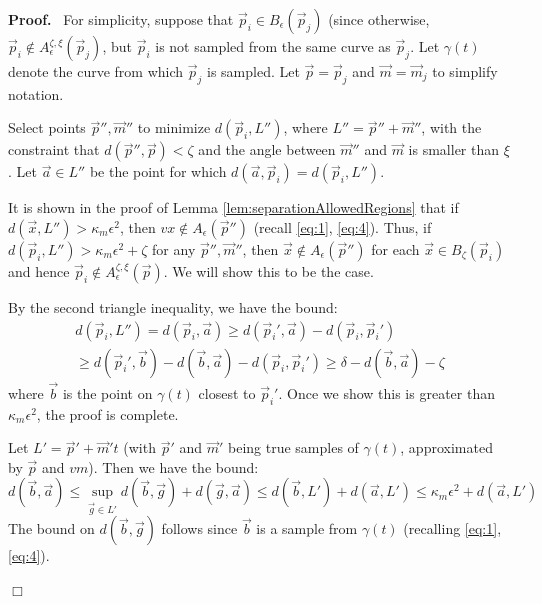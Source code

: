 \documentclass{article}
\newcommand{\nin}{\not\in}
\newenvironment{proof}{
  \noindent\textbf{Proof.}\ }{\hspace*{\fill}
  \begin{math}\Box\end{math}\medskip}
\numberwithin{cntr}{section}
\numberwithin{equation}{section}
\newcommand{\vx}[0]{{\vec{x}}}
\newcommand{\vp}[0]{{\vec{p}}}
\newcommand{\vm}[0]{{\vec{m}}}
\newcommand{\va}[0]{{\vec{a}}}
\newcommand{\vb}[0]{{\vec{b}}}
\newcommand{\vg}[0]{{\vec{g}}}
\newcommand{\ball}[2]{ { B_{#1}(#2) } }
\newcommand{\allowed}[2]{ { A_{#1}(#2) } }
\newcommand{\curvemax}{{\kappa_{m}}}
\newcommand{\curvesep}{{\delta}}
\newcommand{\pointNoise}{{\zeta}}
\newcommand{\tanNoise}{{\xi}}
\newcommand{\nallowed}[2]{ { A^{\pointNoise, \tanNoise}_{#1}(#2) } }
\begin{document}
\begin{proof}
  For simplicity, suppose that $\vp_{i} \in \ball{\epsilon}{\vp_{j}}$ (since otherwise, $\vp_{i} \nin \nallowed{\epsilon}{\vp_{j}}$, but $\vp_{i}$ is not sampled from the same curve as $\vp_{j}$. Let $\gamma(t)$ denote the curve from which $\vp_{j}$ is sampled. Let $\vp = \vp_{j}$ and $\vm = \vm_{j}$ to simplify notation.

  Select points $\vp'', \vm''$ to minimize $d(\vp_{i},L'')$, where $L''=\vp''+\vm''$, with the constraint that $d(\vp'',\vp) < \pointNoise$ and the angle between $\vm''$ and $\vm$ is smaller than $\tanNoise$. Let $\va \in L''$ be the point for which $d(\va,\vp_{i}) = d(\vp_{i},L'')$.

  It is shown in the proof of Lemma \ref{lem:separationAllowedRegions} that if $d(\vx, L'') > \curvemax \epsilon^{2}$, then $vx \nin \allowed{\epsilon}{\vp''}$ (recall \eqref{eq:1}, \eqref{eq:4}). Thus, if $d(\vp_{i},L'') > \curvemax \epsilon^{2} + \pointNoise$ for any $\vp'', \vm''$, then $\vx \nin \allowed{\epsilon}{\vp''}$ for each $\vx \in \ball{\pointNoise}{\vp_{i}}$ and hence $\vp_{i} \nin \nallowed{\epsilon}{\vp}$. We will show this to be the case.


  By the second triangle inequality, we have the bound:
  \begin{multline}
    \label{eq:7}
    d(\vp_{i},L'') = d(\vp_{i},\va) \geq d(\vp_{i}',\va) - d(\vp_{i}, \vp_{i}')\\
    \geq d(\vp_{i}', \vb) - d(\vb,\va) - d(\vp_{i}, \vp_{i}')
    \geq \curvesep - d(\vb,\va) - \pointNoise
  \end{multline}
  where $\vb$ is the point on $\gamma(t)$ closest to $\vp_{i}'$. Once we show this is greater than $\curvemax \epsilon^{2}$, the proof is complete.

Let $L'=\vp' + \vm' t$ (with $\vp'$ and $\vm'$ being true samples of $\gamma(t)$, approximated by $\vp$ and $vm$). Then we have the bound:
  \begin{equation}
    \label{eq:6}
    d(\vb,\va) \leq \sup_{\vg \in L'} d(\vb,\vg) + d(\vg, \va) \leq d(\vb,L') + d(\va,L') \leq \curvemax \epsilon^{2} + d(\va,L')
  \end{equation}
  The bound on $d(\vb, \vg)$ follows since $\vb$ is a sample from $\gamma(t)$ (recalling \eqref{eq:1}, \eqref{eq:4}).


\end{proof}
\end{document}
